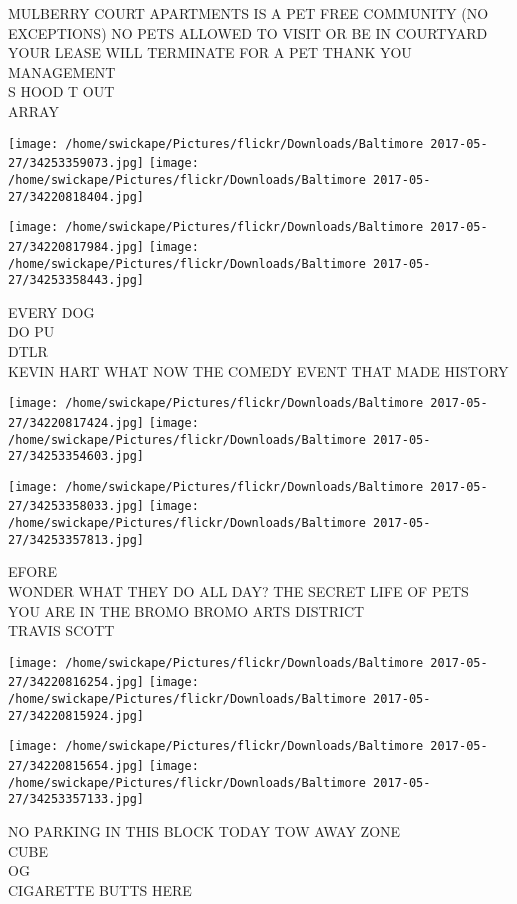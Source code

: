 \documentclass[10pt,letterpaper]{article}
\begin{document}
MULBERRY COURT APARTMENTS IS A PET FREE COMMUNITY (NO EXCEPTIONS) NO PETS ALLOWED TO VISIT OR BE IN COURTYARD YOUR LEASE WILL TERMINATE FOR A PET THANK YOU MANAGEMENT\\
S HOOD T OUT\\
ARRAY
\pagebreak

\texttt{[image: /home/swickape/Pictures/flickr/Downloads/Baltimore 2017-05-27/34253359073.jpg]}
\texttt{[image: /home/swickape/Pictures/flickr/Downloads/Baltimore 2017-05-27/34220818404.jpg]}

\texttt{[image: /home/swickape/Pictures/flickr/Downloads/Baltimore 2017-05-27/34220817984.jpg]}
\texttt{[image: /home/swickape/Pictures/flickr/Downloads/Baltimore 2017-05-27/34253358443.jpg]}

EVERY DOG\\
DO PU\\
DTLR\\
KEVIN HART WHAT NOW THE COMEDY EVENT THAT MADE HISTORY
\pagebreak

\texttt{[image: /home/swickape/Pictures/flickr/Downloads/Baltimore 2017-05-27/34220817424.jpg]}
\texttt{[image: /home/swickape/Pictures/flickr/Downloads/Baltimore 2017-05-27/34253354603.jpg]}

\texttt{[image: /home/swickape/Pictures/flickr/Downloads/Baltimore 2017-05-27/34253358033.jpg]}
\texttt{[image: /home/swickape/Pictures/flickr/Downloads/Baltimore 2017-05-27/34253357813.jpg]}

EFORE\\
WONDER WHAT THEY DO ALL DAY?  THE SECRET LIFE OF PETS\\
YOU ARE IN THE BROMO BROMO ARTS DISTRICT\\
TRAVIS SCOTT
\pagebreak

\texttt{[image: /home/swickape/Pictures/flickr/Downloads/Baltimore 2017-05-27/34220816254.jpg]}
\texttt{[image: /home/swickape/Pictures/flickr/Downloads/Baltimore 2017-05-27/34220815924.jpg]}

\texttt{[image: /home/swickape/Pictures/flickr/Downloads/Baltimore 2017-05-27/34220815654.jpg]}
\texttt{[image: /home/swickape/Pictures/flickr/Downloads/Baltimore 2017-05-27/34253357133.jpg]}

NO PARKING IN THIS BLOCK TODAY TOW AWAY ZONE\\
CUBE\\
OG\\
CIGARETTE BUTTS HERE
\pagebreak
\end{document}
